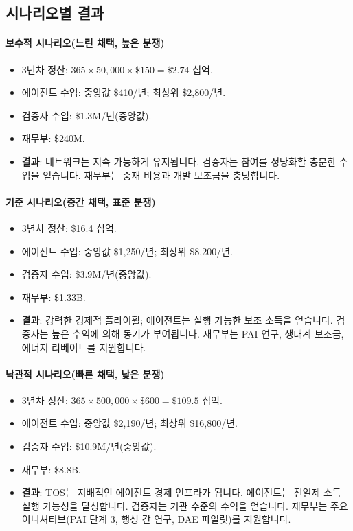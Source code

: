 \documentclass[11pt]{article}
\begin{document}
\subsection{시나리오별 결과}
\paragraph{보수적 시나리오(느린 채택, 높은 분쟁)}
\begin{itemize}[noitemsep]
  \item 3년차 정산: $365 \times 50{,}000 \times \$150 = \$2.74$ 십억.
  \item 에이전트 수입: 중앙값 \$410/년; 최상위 \$2{,}800/년.
  \item 검증자 수입: \$1.3M/년(중앙값).
  \item 재무부: \$240M.
  \item \textbf{결과}: 네트워크는 지속 가능하게 유지됩니다. 검증자는 참여를 정당화할 충분한 수입을 얻습니다. 재무부는 중재 비용과 개발 보조금을 충당합니다.
\end{itemize}

\paragraph{기준 시나리오(중간 채택, 표준 분쟁)}
\begin{itemize}[noitemsep]
  \item 3년차 정산: \$16.4 십억.
  \item 에이전트 수입: 중앙값 \$1{,}250/년; 최상위 \$8{,}200/년.
  \item 검증자 수입: \$3.9M/년(중앙값).
  \item 재무부: \$1.33B.
  \item \textbf{결과}: 강력한 경제적 플라이휠; 에이전트는 실행 가능한 보조 소득을 얻습니다. 검증자는 높은 수익에 의해 동기가 부여됩니다. 재무부는 PAI 연구, 생태계 보조금, 에너지 리베이트를 지원합니다.
\end{itemize}

\paragraph{낙관적 시나리오(빠른 채택, 낮은 분쟁)}
\begin{itemize}[noitemsep]
  \item 3년차 정산: $365 \times 500{,}000 \times \$600 = \$109.5$ 십억.
  \item 에이전트 수입: 중앙값 \$2{,}190/년; 최상위 \$16{,}800/년.
  \item 검증자 수입: \$10.9M/년(중앙값).
  \item 재무부: \$8.8B.
  \item \textbf{결과}: TOS는 지배적인 에이전트 경제 인프라가 됩니다. 에이전트는 전일제 소득 실행 가능성을 달성합니다. 검증자는 기관 수준의 수익을 얻습니다. 재무부는 주요 이니셔티브(PAI 단계 3, 행성 간 연구, DAE 파일럿)를 지원합니다.
\end{itemize}
\end{document}
